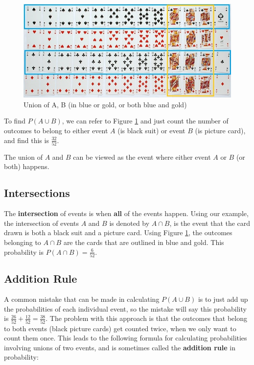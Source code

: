\documentclass[
]{book}
\begin{document}
\begin{figure}
\centering
\includegraphics{images/02-cardsAB.jpg}
\caption{\label{fig:cardsAB}Union of A, B (in blue or gold, or both blue and gold)}
\end{figure}

To find \(P(A \cup B)\), we can refer to Figure \ref{fig:cardsAB} and just count the number of outcomes to belong to either event \(A\) (is black suit) or event \(B\) (is picture card), and find this is \(\frac{32}{52}\).

The union of \(A\) and \(B\) can be viewed as the event where either event \(A\) or \(B\) (or both) happens.

\subsection{Intersections}\label{intersections}

The \textbf{intersection} of events is when \textbf{all} of the events happen. Using our example, the intersection of events \(A\) and \(B\) is denoted by \(A \cap B\), is the event that the card drawn is both a black suit and a picture card. Using Figure \ref{fig:cardsAB}, the outcomes belonging to \(A \cap B\) are the cards that are outlined in blue and gold. This probability is \(P(A \cap B) = \frac{6}{52}\).

\subsection{Addition Rule}\label{addition-rule}

A common mistake that can be made in calculating \(P(A \cup B)\) is to just add up the probabilities of each individual event, so the mistake will say this probability is \(\frac{26}{52} + \frac{12}{52} = \frac{38}{52}\). The problem with this approach is that the outcomes that belong to both events (black picture cards) get counted twice, when we only want to count them once. This leads to the following formula for calculating probabilities involving unions of two events, and is sometimes called the \textbf{addition rule} in probability:
\end{document}
